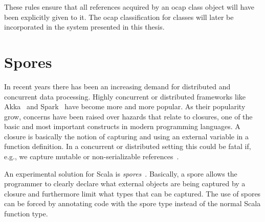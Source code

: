 These rules ensure that all references acquired by an ocap class object will have been
explicitly given to it. The ocap classification for classes will later be
incorporated in the system presented in this thesis.


\section{Spores}\label{sec:spores}

In recent years there has been an increasing demand for distributed and
concurrent data processing. Highly concurrent or distributed frameworks like
Akka~\parencite{akka} and Spark~\parencite{spark} have become more and more
popular. As their popularity grow, concerns have been raised over hazards that
relate to closures, one of the basic and most important constructs in modern
programming languages. A closure is basically the notion of capturing and using
an external variable in a function definition. In a concurrent or distributed
setting this could be fatal if, e.g., we capture mutable or non-serializable
references~\parencite{conf/ecoop/MillerHO14}. 

An experimental solution for Scala is
\emph{spores}~\parencite{conf/ecoop/MillerHO14}. Basically, a spore allows the
programmer to clearly declare what external objects are being captured by a
closure and furthermore limit what types that can be captured. The use of spores
can be forced by annotating code with the spore type instead of the normal
Scala function type. 




